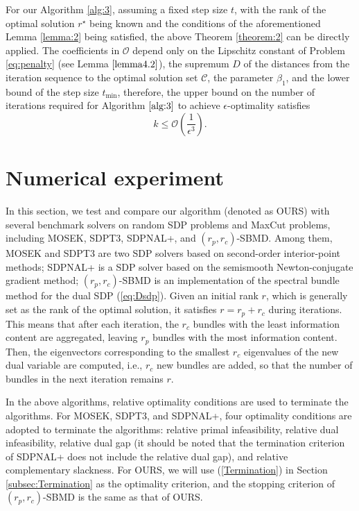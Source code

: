 \documentclass{jcmlatex}
\begin{document}
For our Algorithm \ref{alg:3}, assuming a fixed step size \(t\), with the rank of the optimal solution \(r^{\star}\) being known and the conditions of the aforementioned Lemma \ref{lemma:2} being satisfied, the above Theorem \ref{theorem:2} can be directly applied. The coefficients in \(\mathcal{O}\) depend only on the Lipschitz constant of Problem \ref{eq:penalty} (see Lemma \(\ref{lemma4.2}\)), the supremum \(D\) of the distances from the iteration sequence to the optimal solution set \(\mathcal{C}\), the parameter \(\beta_{1}\), and the lower bound of the step size \(t_{\min}\), therefore, the upper bound on the number of iterations required for Algorithm \(\ref{alg:3}\) to achieve \(\epsilon\)-optimality satisfies
\begin{equation*}
k\leq \mathcal{O}\left(\frac{1}{\epsilon^{3}}\right).
\end{equation*}
\section{Numerical experiment}\label{sec:5}
In this section, we test and compare our algorithm (denoted as OURS) with several benchmark solvers on random SDP problems and MaxCut problems, including MOSEK\cite{aps2019mosek}, SDPT3\cite{toh1999sdpt3}, SDPNAL+\cite{yang2015sdpnal+}, and \((r_{p}, r_{c})\)-SBMD\cite{liao2023overview}. Among them, MOSEK and SDPT3 are two SDP solvers based on second-order interior-point methods; SDPNAL+ is a SDP solver based on the semismooth Newton-conjugate gradient method; \((r_{p}, r_{c})\)-SBMD is an implementation of the spectral bundle method for the dual SDP (\ref{eq:Dsdp}). Given an initial rank \(r\), which is generally set as the rank of the optimal solution, it satisfies \(r = r_p + r_c\) during iterations. This means that after each iteration, the \(r_c\) bundles with the least information content are aggregated, leaving \(r_p\) bundles with the most information content. Then, the eigenvectors corresponding to the smallest \(r_c\) eigenvalues of the new dual variable are computed, i.e., \(r_c\) new bundles are added, so that the number of bundles in the next iteration remains \(r\).

In the above algorithms, relative optimality conditions are used to terminate the algorithms. For MOSEK, SDPT3, and SDPNAL+, four optimality conditions are adopted to terminate the algorithms: relative primal infeasibility, relative dual infeasibility, relative dual gap (it should be noted that the termination criterion of SDPNAL+ does not include the relative dual gap), and relative complementary slackness. For OURS, we will use (\ref{Termination}) in Section \ref{subsec:Termination} as the optimality criterion, and the stopping criterion of \((r_p, r_c)\)-SBMD is the same as that of OURS.
\end{document}
